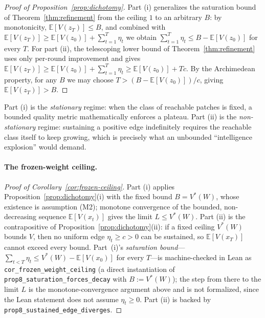 \begin{proof}[Proof of Proposition~\ref{prop:dichotomy}]
Part (i) generalizes the saturation bound of Theorem~\ref{thm:refinement} from the ceiling $1$ to an arbitrary $B$: by monotonicity, $\mathbb{E}[V(z_T)] \leq B$, and combined with $\mathbb{E}[V(z_T)] \geq \mathbb{E}[V(z_0)] + \sum_{t=1}^T \eta_t$ we obtain $\sum_{t=1}^T \eta_t \leq B - \mathbb{E}[V(z_0)]$ for every $T$. For part (ii), the telescoping lower bound of Theorem~\ref{thm:refinement} uses only per-round improvement and gives $\mathbb{E}[V(z_T)] \geq \mathbb{E}[V(z_0)] + \sum_{t=1}^T \eta_t \geq \mathbb{E}[V(z_0)] + Tc$. By the Archimedean property, for any $B$ we may choose $T > (B - \mathbb{E}[V(z_0)])/c$, giving $\mathbb{E}[V(z_T)] > B$.
\end{proof}

Part (i) is the \emph{stationary} regime: when the class of reachable patches is fixed, a bounded quality metric mathematically enforces a plateau. Part (ii) is the \emph{non-stationary} regime: sustaining a positive edge indefinitely requires the reachable class itself to keep growing, which is precisely what an unbounded ``intelligence explosion'' would demand.

\paragraph{The frozen-weight ceiling.}

\begin{proof}[Proof of Corollary~\ref{cor:frozen-ceiling}]
Part (i) applies Proposition~\ref{prop:dichotomy}(i) with the fixed bound $B = V^*(W)$, whose existence is assumption (M2); monotone convergence of the bounded, non-decreasing sequence $\mathbb{E}[V(x_t)]$ gives the limit $L \leq V^*(W)$. Part (ii) is the contrapositive of Proposition~\ref{prop:dichotomy}(ii): if a fixed ceiling $V^*(W)$ bounds $V$, then no uniform edge $\eta_t \geq c > 0$ can be sustained, so $\mathbb{E}[V(x_T)]$ cannot exceed every bound. Part~(i)'s \emph{saturation bound}---$\sum_{t<T}\eta_t \le V^*(W) - \mathbb{E}[V(x_0)]$ for every $T$---is machine-checked in Lean as \texttt{cor\_frozen\_weight\_ceiling} (a direct instantiation of \texttt{prop8\_saturation\_forces\_decay} with $B := V^*(W)$); the step from there to the limit $L$ is the monotone-convergence argument above and is not formalized, since the Lean statement does not assume $\eta_t\ge0$. Part (ii) is backed by \texttt{prop8\_sustained\_edge\_diverges}.
\end{proof}

